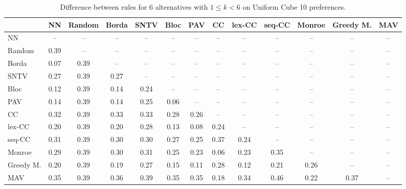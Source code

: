 
\begin{table*}[htbp]
\centering
\begin{tabular}{lcccccccccccc}
\toprule
 & NN & Random & Borda & SNTV & Bloc & PAV & CC & lex-CC & seq-CC & Monroe & Greedy M. & MAV \\
\midrule
NN & -- & -- & -- & -- & -- & -- & -- & -- & -- & -- & -- & -- \\
Random & \cellcolor{blue!39} 0.39 & -- & -- & -- & -- & -- & -- & -- & -- & -- & -- & -- \\
Borda & \cellcolor{blue!7} 0.07 & \cellcolor{blue!39} 0.39 & -- & -- & -- & -- & -- & -- & -- & -- & -- & -- \\
SNTV & \cellcolor{blue!27} 0.27 & \cellcolor{blue!39} 0.39 & \cellcolor{blue!27} 0.27 & -- & -- & -- & -- & -- & -- & -- & -- & -- \\
Bloc & \cellcolor{blue!12} 0.12 & \cellcolor{blue!39} 0.39 & \cellcolor{blue!14} 0.14 & \cellcolor{blue!24} 0.24 & -- & -- & -- & -- & -- & -- & -- & -- \\
PAV & \cellcolor{blue!14} 0.14 & \cellcolor{blue!39} 0.39 & \cellcolor{blue!14} 0.14 & \cellcolor{blue!25} 0.25 & \cellcolor{blue!6} 0.06 & -- & -- & -- & -- & -- & -- & -- \\
CC & \cellcolor{blue!32} 0.32 & \cellcolor{blue!39} 0.39 & \cellcolor{blue!33} 0.33 & \cellcolor{blue!33} 0.33 & \cellcolor{blue!28} 0.28 & \cellcolor{blue!26} 0.26 & -- & -- & -- & -- & -- & -- \\
lex-CC & \cellcolor{blue!20} 0.20 & \cellcolor{blue!39} 0.39 & \cellcolor{blue!20} 0.20 & \cellcolor{blue!28} 0.28 & \cellcolor{blue!13} 0.13 & \cellcolor{blue!8} 0.08 & \cellcolor{blue!24} 0.24 & -- & -- & -- & -- & -- \\
seq-CC & \cellcolor{blue!31} 0.31 & \cellcolor{blue!39} 0.39 & \cellcolor{blue!30} 0.30 & \cellcolor{blue!30} 0.30 & \cellcolor{blue!27} 0.27 & \cellcolor{blue!25} 0.25 & \cellcolor{blue!37} 0.37 & \cellcolor{blue!24} 0.24 & -- & -- & -- & -- \\
Monroe & \cellcolor{blue!28} 0.29 & \cellcolor{blue!39} 0.39 & \cellcolor{blue!30} 0.30 & \cellcolor{blue!31} 0.31 & \cellcolor{blue!25} 0.25 & \cellcolor{blue!23} 0.23 & \cellcolor{blue!6} 0.06 & \cellcolor{blue!23} 0.23 & \cellcolor{blue!35} 0.35 & -- & -- & -- \\
Greedy M. & \cellcolor{blue!20} 0.20 & \cellcolor{blue!39} 0.39 & \cellcolor{blue!19} 0.19 & \cellcolor{blue!27} 0.27 & \cellcolor{blue!15} 0.15 & \cellcolor{blue!11} 0.11 & \cellcolor{blue!28} 0.28 & \cellcolor{blue!12} 0.12 & \cellcolor{blue!21} 0.21 & \cellcolor{blue!26} 0.26 & -- & -- \\
MAV & \cellcolor{blue!35} 0.35 & \cellcolor{blue!39} 0.39 & \cellcolor{blue!36} 0.36 & \cellcolor{blue!39} 0.39 & \cellcolor{blue!35} 0.35 & \cellcolor{blue!35} 0.35 & \cellcolor{blue!18} 0.18 & \cellcolor{blue!34} 0.34 & \cellcolor{blue!46} 0.46 & \cellcolor{blue!22} 0.22 & \cellcolor{blue!37} 0.37 & -- \\
\bottomrule
\end{tabular}

\caption{Difference between rules for 6 alternatives with $1 \leq k < 6$ on Uniform Cube 10 preferences.}
\label{tab:rule_distance_heatmap-m=[6]-pref_dist=euclidean__args__dimensions=10_-_space=uniform_cube}
\end{table*}
    